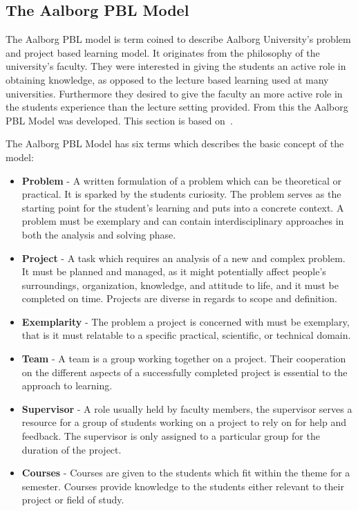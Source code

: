 \subsection{The Aalborg PBL Model}
The Aalborg PBL model is term coined to describe Aalborg University's problem and project based learning model. It originates from the philosophy of the university's faculty. They were interested in giving the students an active role in obtaining knowledge, as opposed to the lecture based learning used at many universities. Furthermore they desired to give the faculty an more active role in the students experience than the lecture setting provided. From this the Aalborg PBL Model was developed. This section is based on~\citep{Barge10}.

The Aalborg PBL Model has six terms which describes the basic concept of the model:

\begin{itemize}
	\item \textbf{Problem} - A written formulation of a problem which can be theoretical or practical. It is sparked by the students curiosity. The problem serves as the starting point for the student's learning and puts into a concrete context. A problem must be exemplary and can contain interdisciplinary approaches	in both the analysis and solving phase.
	\item \textbf{Project} - A task which requires an analysis of a new and complex problem. It must be planned and managed, as it might potentially affect people's surroundings, organization, knowledge, and attitude to life, and it must be completed on time. Projects are diverse in regards to scope and definition.
	\item \textbf{Exemplarity} - The problem a project is concerned with must be exemplary, that is it must relatable to a specific practical, scientific, or technical domain.
	\item \textbf{Team} - A team is a group working together on a project. Their cooperation on the different aspects of a successfully completed project is essential to the approach to learning.
	\item \textbf{Supervisor} - A role usually held by faculty members, the supervisor serves a resource for a group of students working on a project to rely on for help and feedback. The supervisor is only assigned to a particular group for the duration of the project. 
	\item \textbf{Courses} - Courses are given to the students which fit within the theme for a semester. Courses provide knowledge to the students either relevant to their project or field of study.
\end{itemize}

